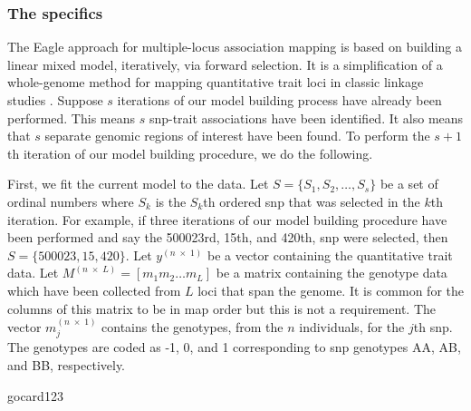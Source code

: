 \documentclass{nature}
\begin{document}
 
 
 

\subsubsection{The specifics}





The Eagle approach for multiple-locus association mapping is based on building a linear mixed model, iteratively, via forward 
selection.  It is a simplification of a whole-genome method for mapping quantitative trait loci in classic linkage studies \cite{verbyla2007analysis}.
Suppose $s$ iterations of our model building process have already been performed. This means $s$ snp-trait 
associations have been identified.  It also means that $s$ separate genomic regions of interest have been found.  
To perform the $s+1$th  iteration of 
our model building procedure, we do the following. 

First, we fit the current model to the data. 
Let $S = \{ S_1, S_2, \ldots, S_s\}$ be a set of ordinal numbers where $S_k$ is the $S_k$th ordered snp that was 
selected in the $k$th iteration. For example, if three iterations of our model building procedure 
have been performed and say the 500023rd, 15th, and 420th, 
snp were selected, then $S=\{500023, 15, 420\}$. 
Let $y^{(n \; \times \;1)}$ be a vector containing the quantitative trait data. 
Let $M^{(n \; \times \; L)} = [m_1 m_2 \ldots m_L]$ be a matrix containing the genotype data which have been collected 
from $L$ loci that span the genome.  It is common for the columns of this matrix to be in map order but this is not a requirement. 
The vector $m_j^{(n \; \times \; 1)}$ contains the genotypes, from the $n$ individuals,  for the $j$th snp. 
The genotypes are coded as -1, 0, and 1 corresponding to snp genotypes AA, AB, and BB, respectively. 


gocard123
\end{document}
